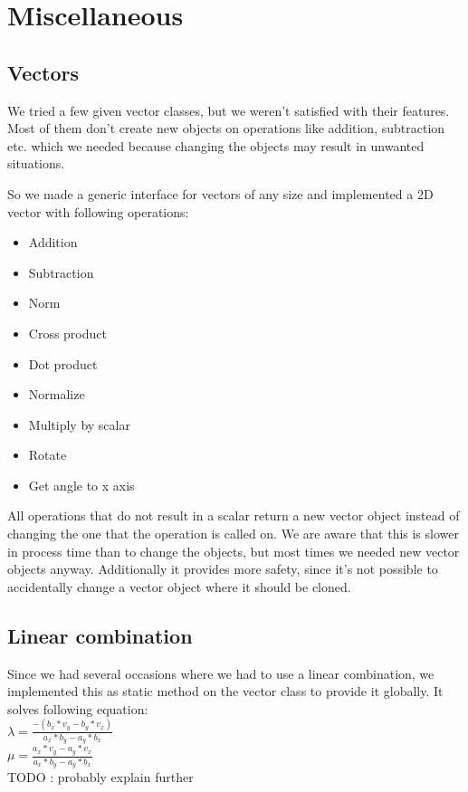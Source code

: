 
\section{Miscellaneous}

\subsection{Vectors}
\label{sec:vectors}

We tried a few given vector classes, but we weren't satisfied
with their features. Most of them don't create new objects
on operations like addition, subtraction etc. which we needed because 
changing the objects may result in unwanted situations. %

\noindent So we made a generic interface for vectors of any size and
implemented a 2D vector with following operations:

\begin{itemize}
\item Addition
\item Subtraction
\item Norm
\item Cross product
\item Dot product
\item Normalize
\item Multiply by scalar
\item Rotate 
\item Get angle to x axis
\end{itemize}

All operations that do not result in a scalar return a new vector object
instead of changing the one that the operation is called on. We are aware
that this is slower in process time than to change the objects, but most
times we needed new vector objects anyway. Additionally it provides more
safety, since it's not possible to accidentally change a vector object
where it should be cloned.

\subsection{Linear combination}
\label{sec:linearCombination}

Since we had several occasions where we had to use a
linear combination, we implemented this as static method
on the vector class to provide it globally. It solves following
equation: \\

$ \lambda = \frac{-(b_x*v_y - b_y * v_x)}{a_x * b_y - a_y * b_x}$\\

$\mu = \frac{a_x * v_y - a_y * v_x}{a_x * b_y - a_y * b_x} $ \\

TODO : probably explain further

